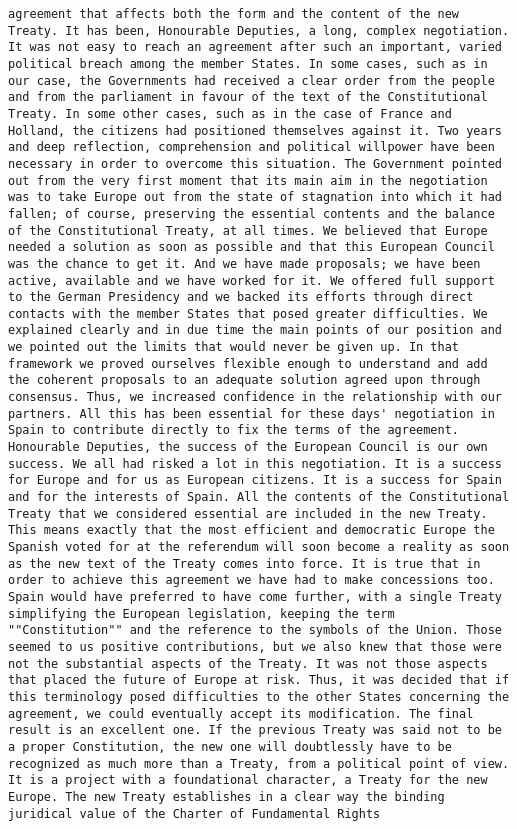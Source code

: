 \documentclass[
]{article}
\begin{document}
\begin{verbatim}
agreement that affects both the form and the content of the new Treaty. It has been, Honourable Deputies, a long, complex negotiation. It was not easy to reach an agreement after such an important, varied political breach among the member States. In some cases, such as in our case, the Governments had received a clear order from the people and from the parliament in favour of the text of the Constitutional Treaty. In some other cases, such as in the case of France and Holland, the citizens had positioned themselves against it. Two years and deep reflection, comprehension and political willpower have been necessary in order to overcome this situation. The Government pointed out from the very first moment that its main aim in the negotiation was to take Europe out from the state of stagnation into which it had fallen; of course, preserving the essential contents and the balance of the Constitutional Treaty, at all times. We believed that Europe needed a solution as soon as possible and that this European Council was the chance to get it. And we have made proposals; we have been active, available and we have worked for it. We offered full support to the German Presidency and we backed its efforts through direct contacts with the member States that posed greater difficulties. We explained clearly and in due time the main points of our position and we pointed out the limits that would never be given up. In that framework we proved ourselves flexible enough to understand and add the coherent proposals to an adequate solution agreed upon through consensus. Thus, we increased confidence in the relationship with our partners. All this has been essential for these days' negotiation in Spain to contribute directly to fix the terms of the agreement. Honourable Deputies, the success of the European Council is our own success. We all had risked a lot in this negotiation. It is a success for Europe and for us as European citizens. It is a success for Spain and for the interests of Spain. All the contents of the Constitutional Treaty that we considered essential are included in the new Treaty. This means exactly that the most efficient and democratic Europe the Spanish voted for at the referendum will soon become a reality as soon as the new text of the Treaty comes into force. It is true that in order to achieve this agreement we have had to make concessions too. Spain would have preferred to have come further, with a single Treaty simplifying the European legislation, keeping the term ""Constitution"" and the reference to the symbols of the Union. Those seemed to us positive contributions, but we also knew that those were not the substantial aspects of the Treaty. It was not those aspects that placed the future of Europe at risk. Thus, it was decided that if this terminology posed difficulties to the other States concerning the agreement, we could eventually accept its modification. The final result is an excellent one. If the previous Treaty was said not to be a proper Constitution, the new one will doubtlessly have to be recognized as much more than a Treaty, from a political point of view. It is a project with a foundational character, a Treaty for the new Europe. The new Treaty establishes in a clear way the binding juridical value of the Charter of Fundamental Rights 
\end{verbatim}
\end{document}
